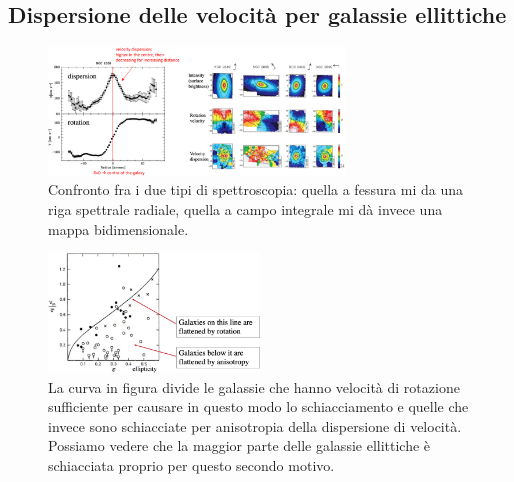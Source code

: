 \subsection{Dispersione delle velocità per galassie ellittiche}

\begin{figure}
    \centering
    \includegraphics[width =0.7\textwidth]{immagini/spettroscopia-fessura-campo-integrale.png}
    \caption{Confronto fra i due tipi di spettroscopia: quella a fessura mi da una riga spettrale radiale, quella a campo integrale mi dà invece una mappa bidimensionale.}
    \label{fig:spettroscopia-fessura-campo-integrale}
\end{figure}

\begin{figure}
    \centering
    \includegraphics[width = 0.5\textwidth]{immagini/schiacciamento-galassie.png}
    \caption{La curva in figura divide le galassie che hanno velocità di rotazione sufficiente per causare in questo modo lo schiacciamento e quelle che invece sono schiacciate per anisotropia della dispersione di velocità. Possiamo vedere che la maggior parte delle galassie ellittiche è schiacciata proprio per questo secondo motivo.}
    \label{fig:schiacciamento-galassie}
\end{figure}

